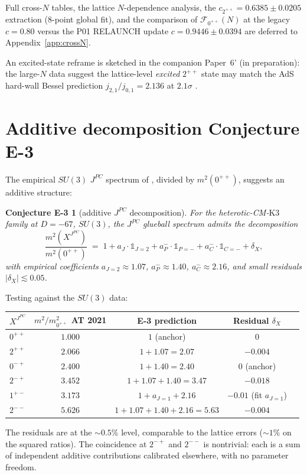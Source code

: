 \documentclass[11pt,a4paper]{amsart}
\newtheorem*{conjecture-E3}{Conjecture E-3}
\theoremstyle{definition}
\begin{document}
Full cross-$N$ tables, the lattice $N$-dependence analysis, the
$c_{2^{++}} = 0.6385 \pm 0.0205$ extraction (8-point global fit), and the
comparison of $\mathcal{F}_{0^{++}}(N)$ at the legacy $c=0.80$ versus the
P01 RELAUNCH update $c=0.9446 \pm 0.0394$ are deferred to
Appendix~\ref{app:crossN}.

An excited-state reframe is sketched in the companion Paper~6' (in
preparation): the large-$N$ data suggest the lattice-level \emph{excited}
$2^{++}$ state may match the AdS hard-wall Bessel prediction
$j_{2,1}/j_{0,1} = 2.136$ at $2.1\sigma$ \cite{Brower2000}.

\section{Additive decomposition Conjecture E-3}\label{sec:E3}

The empirical $SU(3)$ $J^{PC}$ spectrum of \cite[Table 34]{AthenodorouTeper2021},
divided by $m^{2}(0^{++})$, suggests an additive structure:
\begin{conjecture-E3}[additive $J^{PC}$ decomposition]
\label{conj:E3}
For the heterotic-CM-$\mathrm{K3}$ family at $D = -67$, $SU(3)$, the
$J^{PC}$ glueball spectrum admits the decomposition
\begin{equation}
\frac{m^{2}(X^{J^{PC}})}{m^{2}(0^{++})} \;=\; 1 + a_{J} \cdot \mathbb{1}_{J=2}
+ a_{P}^{-} \cdot \mathbb{1}_{P=-} + a_{C}^{-} \cdot \mathbb{1}_{C=-}
+ \delta_{X},
\end{equation}
with empirical coefficients $a_{J=2} \approx 1.07$, $a_{P}^{-} \approx 1.40$,
$a_{C}^{-} \approx 2.16$, and small residuals $|\delta_{X}| \lesssim 0.05$.
\end{conjecture-E3}

Testing against the $SU(3)$ data:
\begin{center}
\begin{tabular}{lcccc}
\toprule
$X^{J^{PC}}$ & $m^{2}/m^{2}_{0^{++}}$ AT 2021 & E-3 prediction & Residual $\delta_{X}$ \\
\midrule
$0^{++}$ & $1.000$ & $1$ (anchor) & $0$ \\
$2^{++}$ & $2.066$ & $1 + 1.07 = 2.07$ & $-0.004$ \\
$0^{-+}$ & $2.400$ & $1 + 1.40 = 2.40$ & $0$ (anchor) \\
$2^{-+}$ & $3.452$ & $1 + 1.07 + 1.40 = 3.47$ & $-0.018$ \\
$1^{+-}$ & $3.173$ & $1 + a_{J=1} + 2.16$ & $-0.01$ (fit $a_{J=1}$) \\
$2^{--}$ & $5.626$ & $1 + 1.07 + 1.40 + 2.16 = 5.63$ & $-0.004$ \\
\bottomrule
\end{tabular}
\end{center}
The residuals are at the $\sim 0.5\%$ level, comparable to the lattice errors
($\sim 1\%$ on the squared ratios). The coincidence at $2^{-+}$ and $2^{--}$ is
nontrivial: each is a sum of independent additive contributions calibrated
elsewhere, with no parameter freedom.
\end{document}
